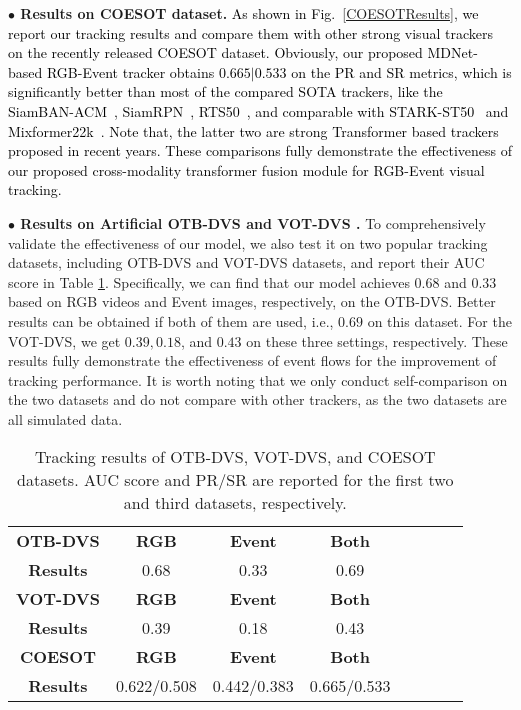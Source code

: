 \documentclass[journal]{IEEEtran}
\begin{document}
\textbf{$\bullet$ Results on COESOT dataset.}
\textcolor{black}{
As shown in Fig.~\ref{COESOTResults}, we report our tracking results and compare them with other strong visual trackers on the recently released COESOT dataset. Obviously, our proposed MDNet-based RGB-Event tracker obtains $0.665|0.533$ on the PR and SR metrics, which is significantly better than most of the compared SOTA trackers, like the SiamBAN-ACM~\cite{han2021SiamBANACM}, SiamRPN~\cite{li2018siamRPN}, RTS50~\cite{paul2022RTS}, and comparable with STARK-ST50~\cite{yan2021stark} and Mixformer22k~\cite{cui2022mixformer}. Note that, the latter two are strong Transformer based trackers proposed in recent years. These comparisons fully demonstrate the effectiveness of our proposed cross-modality transformer fusion module for RGB-Event visual tracking. 
}







\textbf{$\bullet$ Results on Artificial OTB-DVS \cite{wu2015OTB} and VOT-DVS \cite{vot2019seventh}.}
To comprehensively validate the effectiveness of our model, we also test it on two popular tracking datasets, including OTB-DVS and VOT-DVS datasets, and report their AUC score in Table \ref{otbvotResults}. Specifically, we can find that our model achieves $0.68$ and $0.33$ based on RGB videos and Event images, respectively, on the OTB-DVS. Better results can be obtained if both of them are used, i.e., $0.69$ on this dataset. For the VOT-DVS, we get $0.39, 0.18$, and  $0.43$ on these three settings, respectively. These results fully demonstrate the effectiveness of event flows for the improvement of tracking performance. It is worth noting that we only conduct self-comparison on the two datasets and do not compare with other trackers, as the two datasets are all simulated data.



\begin{table}
\center
\small   
\caption{Tracking results of OTB-DVS, VOT-DVS, and COESOT datasets. AUC score and PR/SR are reported for the first two and third datasets, respectively.} 
\label{otbvotResults} 
\begin{tabular}{c|ccccccc} 		\hline \toprule [0.5 pt] 
\textbf{OTB-DVS} 			&\textbf{RGB} 	  	&\textbf{Event} 	  &\textbf{Both} 	      \\ 
\textbf{Results}   	&0.68  	&0.33 	&0.69  \\ 
\hline 
\textbf{VOT-DVS} 			&\textbf{RGB} 	  	&\textbf{Event} 	  &\textbf{Both} 		  \\
\textbf{Results}    &0.39   &0.18   &0.43  \\
\hline 
\textbf{COESOT} 			&\textbf{RGB} 	  	&\textbf{Event} 	  &\textbf{Both} 		  \\
\textbf{Results} 			&0.622/0.508 	  	&0.442/0.383 	  &0.665/0.533 		  \\
\hline \toprule [0.5 pt]
\end{tabular}
\end{table} 
\end{document}
